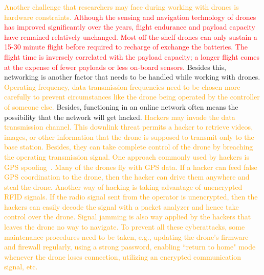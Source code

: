 \textcolor{orange}{Another challenge that researchers may face during working with drones is hardware constraints.}
\textcolor{red}{
Although the sensing and navigation technology of drones has improved significantly over the years, flight endurance and payload capacity have remained relatively unchanged. Most off-the-shelf drones can only sustain a 15-30 minute flight before required to recharge of exchange the batteries. 
The flight time is inversely correlated with the payload capacity; a longer flight comes at the expense of fewer payloads or less on-board sensors. 
}
Besides this, networking is another factor that needs to be handled while working with drones.  \textcolor{orange}{Operating frequency, data transmission frequencies need to be chosen more carefully to prevent circumstances like the drone being operated by the controller of someone else.} 
Besides, functioning in an online network often means the possibility that the network will get hacked. \textcolor{orange}{Hackers may invade the data transmission channel. This downlink threat permits a hacker to retrieve videos, images, or other information that the drone is supposed to transmit only to the base station. Besides, they can take complete control of the drone by breaching the operating transmission signal. One approach commonly used by hackers is GPS spoofing~\cite{dronehacking}. Many of the drones fly with GPS data. If a hacker can feed false GPS coordination to the drone, then the hacker can drive them anywhere and steal the drone. Another way of hacking is taking advantage of unencrypted RFID signals. If the radio signal sent from the operator is unencrypted, then the hackers can easily decode the signal with a packet analyzer and hence take control over the drone. Signal jamming is also way applied by the hackers that leaves the drone no way to navigate.}
\textcolor{orange}{To prevent all these cyberattacks, some maintenance procedures need to be taken, e.g., updating the drone's firmware and firewall regularly, using a strong password, enabling ``return to home" mode whenever the drone loses connection, utilizing an encrypted communication signal, etc.}

